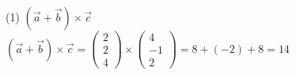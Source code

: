 \documentclass[fleqn]{jsarticle}
\begin{document}
    \begin{description}
		\setlength{\itemsep}{0.5cm}
        \begin{spacing}{1.2}

            \item[(1)]
                $ (\vec{a}+\vec{b})\times\vec{c} $\\
                $ (\vec{a}+\vec{b})\times\vec{c}
                =
                \left(
                    \begin{array}{c}
                        2 \\
                        2 \\
                        4
                    \end{array}
                \right)
                \times
                \left(
                    \begin{array}{c}
                        4 \\
                        -1 \\
                        2
                    \end{array}
                \right)
                =
                8 + (-2) + 8
                =
                14
                $


\end{spacing}
\end{description}
\end{document}
